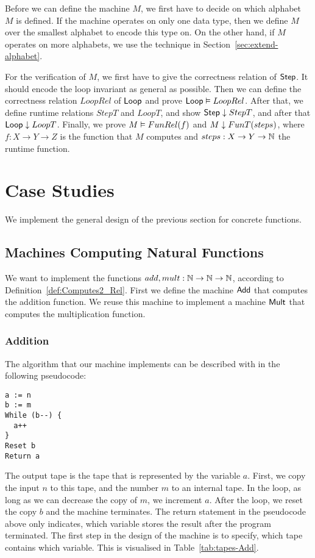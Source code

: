 Before we can define the machine $M$, we first have to decide on which alphabet $M$ is defined.  If the machine operates on only one data type, then
we define $M$ over the smallest alphabet to encode this type on.  On the other hand, if $M$ operates on more alphabets, we use the technique in
Section~\ref{sec:extend-alphabet}.

For the verification of $M$, we first have to give the correctness relation of $\mathsf{Step}$.  It should encode the loop invariant as general as
possible.  Then we can define the correctness relation $LoopRel$ of $\mathsf{Loop}$ and prove $\mathsf{Loop} \mathrel{\vDash} LoopRel$.  After that, we define runtime
relations $StepT$ and $LoopT$, and show $\mathsf{Step} \mathrel{\downarrow} StepT$, and after that $\mathsf{Loop} \mathrel{\downarrow} LoopT$.  Finally, we prove
$M \mathrel{\vDash} FunRel(f)$ and $M \mathrel{\downarrow} FunT(steps)$, where $f:X \to Y \to Z$ is the function that $M$ computes and $steps:X \rightarrow Y \rightarrow \mathbb{N}$ the
runtime function.


\section{Case Studies}
\label{sec:case-studies}

We implement the general design of the previous section for concrete functions.

\subsection{Machines Computing Natural Functions}
\label{sec:NatTM}

We want to implement the functions $add,mult:\mathbb{N}\rightarrow\mathbb{N}\rightarrow\mathbb{N}$, according to Definition~\ref{def:Computes2_Rel}.  First we define the machine
$\mathsf{Add}$ that computes the addition function.  We reuse this machine to implement a machine $\mathsf{Mult}$ that computes the multiplication function.

\subsubsection{Addition}
\label{sec:Add}

The algorithm that our machine implements can be described with in the following pseudocode:
{
  \small
\begin{lstlisting}[style=pseudocode]
a := n
b := m
While (b--) {
  a++
}
Reset b
Return a
\end{lstlisting}
}
The output tape is the tape that is represented by the variable $a$.  First, we copy the input $n$ to this tape, and the number $m$ to an internal
tape.  In the loop, as long as we can decrease the copy of $m$, we increment $a$.  After the loop, we reset the copy $b$ and the machine terminates.
The return statement in the pseudocode above only indicates, which variable stores the result after the program terminated.  The first step in the
design of the machine is to specify, which tape contains which variable.  This is visualised in Table~\ref{tab:tapes-Add}.

